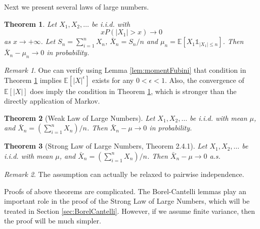 \documentclass[openany]{book}
\newtheorem{theorem}{Theorem}[chapter]
\theoremstyle{definition}
\theoremstyle{remark}
\newtheorem*{remark}{Remark}
\begin{document}
Next we present several laws of large numbers.
\begin{theorem}\label{thm:generalWeakLaw}
    Let $X_1,X_2,\ldots$ be i.i.d. with
    \begin{equation*}
        xP\left(|X_1|>x\right)\to0
    \end{equation*}
    as $x\to+\infty$. Let $S_n=\sum_{i=1}^{n}X_n$, $\bar{X}_n=S_n/n$ and $\mu_n=\mathbb{E}\left[X_1\mathds{1}_{|X_1|\le n}\right]$. Then $\bar{X}_n-\mu_n\to0$ in probability.
\end{theorem}
\begin{remark}
    One can verify using Lemma \ref{lem:momentFubini} that condition in Theorem \ref{thm:generalWeakLaw} implies $\mathbb{E}\left[|X|^{\epsilon}\right]$ exists for any $0<\epsilon<1$. Also, the convergence of $\mathbb{E}\left[|X|\right]$ does imply the condition in Theorem \ref{thm:generalWeakLaw}, which is stronger than the directly application of Markov.
\end{remark}
\begin{theorem}[Weak Law of Large Numbers]\label{thm:weakLaw}
    Let $X_1,X_2,\ldots$ be i.i.d. with mean $\mu$, and $\bar{X}_n=\left(\sum_{i=1}^{n}X_n\right)/n$. Then $\bar{X}_n-\mu\to0$ in probability.
\end{theorem}
\begin{theorem}[Strong Law of Large Numbers, \cite{D10} Theorem 2.4.1]\label{thm:strongLaw}
    Let $X_1,X_2,\ldots$ be i.i.d. with mean $\mu$, and $\bar{X}_n=\left(\sum_{i=1}^{n}X_n\right)/n$. Then $\bar{X}_n-\mu\to0$ a.s.
\end{theorem}
\begin{remark}
    The assumption can actually be relaxed to pairwise independence.
\end{remark}

Proofs of above theorems are complicated. The Borel-Cantelli lemmas play an important role in the proof of the Strong Law of Large Numbers, which will be treated in Section \ref{sec:BorelCantelli}. However, if we assume finite variance, then the proof will be much simpler.
\end{document}
